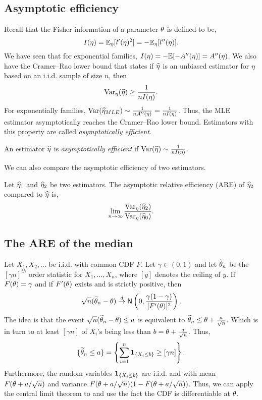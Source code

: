\subsection{Asymptotic efficiency}
Recall that the Fisher information of a parameter ${\theta}$ is defined to be,
\[I(\eta) = {\mathbb{E}}_\eta[l'(\eta)^2] = -{\mathbb{E}}_\eta[l''(\eta)]. \]
We have seen that for exponential families, $I(\eta) = -{\mathbb{E}}[-A''(\eta)]=A''(\eta)$. We also have the Cramer--Rao lower bound that states if $\widehat{\eta}$ is an unbiased estimator for $\eta$ based on an i.i.d. sample of size $n$, then
\[\operatorname{Var}_\eta(\widehat{\eta}) \ge \frac{1}{nI(\eta)}. \]
For exponentially families, $\operatorname{Var}(\widehat{\eta}_{MLE}) \sim \frac{1}{n A''(\eta)} = \frac{1}{nI(\eta)}$. Thus, the MLE estimator asymptotically reaches the Cramer--Rao lower bound. Estimators with this property are called \emph{asymptotically efficient}.
\begin{definition}
 An estimator $\widehat{\eta}$ is \emph{asymptotically efficient} if $\operatorname{Var}(\widehat{\eta}) \sim \frac{1}{nI(\eta)}$.
\end{definition}
We can also compare the asymptotic efficiency of two estimators. 
\begin{definition}
    Let $\widehat{\eta}_1$ and $\widehat{\eta}_2$ be two estimators. The asymptotic relative efficiency (ARE) of $\widehat{\eta}_2$ compared to $\widehat{\eta}$ is,
    \[\lim_{n \to \infty} \frac{\operatorname{Var}_\eta(\widehat{\eta}_2)}{\operatorname{Var}_\eta(\widehat{\eta}_0)}. \]
\end{definition}
\subsection{The ARE of the median}
Let $X_1,X_2,\ldots$ be i.i.d. with common CDF $F$. Let $\gamma \in (0,1)$ and let $\widetilde{{\theta}}_n$ be the $[\gamma n]^{th}$ order statistic for $X_1,\ldots, X_n$, where $[y]$ denotes the ceiling of $y$. If $F({\theta}) = \gamma$ and if $F'({\theta})$ exists and is strictly positive, then 
\[\sqrt{n}(\widetilde{{\theta}}_n - {\theta}) \stackrel{d}{\to} \mathsf{N}\left(0, \frac{\gamma(1-\gamma)}{[F'({\theta})]^2}\right). \]
The idea is that the event $\sqrt{n}(\widetilde{{\theta}}_n -{\theta}) \le a$ is equivalent to $\widetilde{{\theta}}_n \le {\theta} + \frac{a}{\sqrt{n}}$. Which is in turn to at least $[\gamma n]$ of $X_i$'s being less than $b={\theta} + \frac{a}{\sqrt{n}}$. Thus,
\[\{\widetilde{{\theta}}_n \le a\} = \left\{\sum_{i=1}^n {{\bf 1}}_{\{X_i \le b\}} \ge [\gamma n] \right\}. \]
Furthermore, the random variables ${{\bf 1}}_{\{X_i \le b\}}$ are i.i.d. and with mean $F({\theta}+a/\sqrt{n})$ and variance $F({\theta}+a/\sqrt{n})(1-F({\theta}+a/\sqrt{n}))$. Thus, we can apply the central limit theorem to and use the fact the CDF is differentiable at ${\theta}$. 


